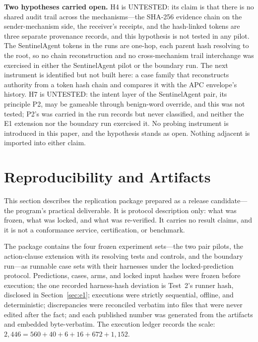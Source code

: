 \documentclass[sigconf,anonymous,nonacm]{acmart}
\newcommand{\code}[1]{\texttt{\detokenize{#1}}}
\newcommand{\status}[1]{\textsc{#1}}
\begin{document}
\textbf{Two hypotheses carried open.} H4 is \status{UNTESTED}: its claim is that there is no shared audit trail across the mechanisms---the SHA-256 evidence chain on the sender-mechanism side, the receiver's receipts, and the hash-linked tokens are three separate provenance records, and this hypothesis is not tested in any pilot. The SentinelAgent tokens in the runs are one-hop, each parent hash resolving to the root, so no chain reconstruction and no cross-mechanism trail interchange was exercised in either the SentinelAgent pilot or the boundary run. The next instrument is identified but not built here: a case family that reconstructs authority from a token hash chain and compares it with the APC envelope's history. H7 is \status{UNTESTED}: the intent layer of the SentinelAgent pair, its principle P2, may be gameable through benign-word override, and this was not tested; P2's \code{intent_text} was carried in the run records but never classified, and neither the E1 extension nor the boundary run exercised it. No probing instrument is introduced in this paper, and the hypothesis stands as open. Nothing adjacent is imported into either claim.

\section{Reproducibility and Artifacts}
\label{sec:repro}

This section describes the replication package prepared as a release candidate---the program's practical deliverable. It is protocol description only: what was frozen, what was locked, and what was re-verified. It carries no result claims, and it is not a conformance service, certification, or benchmark.

The package contains the four frozen experiment sets---the two pair pilots, the action-clause extension with its resolving tests and controls, and the boundary run---as runnable case sets with their harnesses under the locked-prediction protocol. Predictions, cases, arms, and locked input hashes were frozen before execution; the one recorded harness-hash deviation is Test~2's runner hash, disclosed in Section~\ref{sec:e1}; executions were strictly sequential, offline, and deterministic; discrepancies were reconciled verbatim into files that were never edited after the fact; and each published number was generated from the artifacts and embedded byte-verbatim. The execution ledger records the scale: $2{,}446 = 560 + 40 + 6 + 16 + 672 + 1{,}152$.
\end{document}
